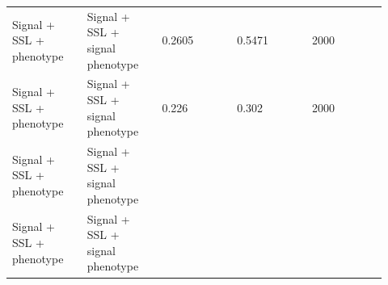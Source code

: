 \documentclass[11pt]{article}
\begin{document}
\begin{landscape}
\begin{longtable}{L{0.184\linewidth} L{0.184\linewidth} L{0.184\linewidth} L{0.184\linewidth} L{0.184\linewidth}}
Signal + SSL + phenotype & Signal + SSL + signal phenotype & 0.\allowbreak{}2605 & 0.\allowbreak{}5471 & 2000 \\
Signal + SSL + phenotype & Signal + SSL + signal phenotype & 0.\allowbreak{}226 & 0.\allowbreak{}302 & 2000 \\
Signal + SSL + phenotype & Signal + SSL + signal phenotype &  &  &  \\
Signal + SSL + phenotype & Signal + SSL + signal phenotype &  &  &  \\
\end{longtable}
\normalsize
\end{landscape}
\end{document}
